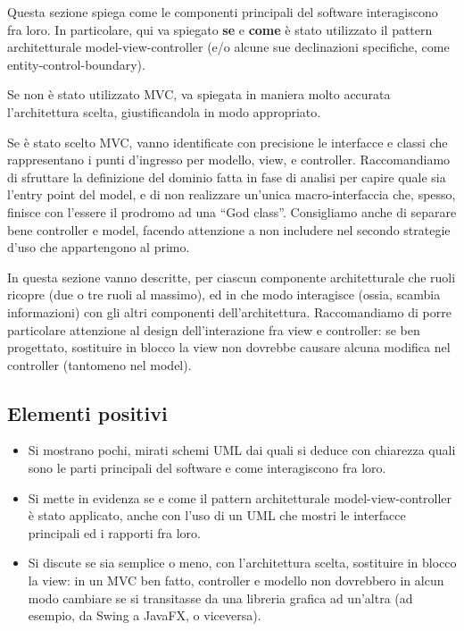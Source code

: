 \documentclass[a4paper,12pt]{report}
\begin{document}
Questa sezione spiega come le componenti principali del software interagiscono fra loro.
%
In particolare, qui va spiegato \textbf{se} e \textbf{come} è stato utilizzato il pattern
architetturale model-view-controller (e/o alcune sue declinazioni specifiche, come entity-control-boundary).

Se non è stato utilizzato MVC, va spiegata in maniera molto accurata l'architettura scelta, giustificandola in modo appropriato.

Se è stato scelto MVC, vanno identificate con precisione le interfacce e classi che rappresentano i punti d'ingresso per modello, view, e controller.
Raccomandiamo di sfruttare la definizione del dominio fatta in fase di analisi per capire quale sia l'entry point del model, e di non realizzare un'unica macro-interfaccia che, spesso, finisce con l'essere il prodromo ad una ``God class''.
%
Consigliamo anche di separare bene controller e model, facendo attenzione a non includere nel secondo strategie d'uso che appartengono al primo.

In questa sezione vanno descritte, per ciascun componente architetturale che ruoli ricopre (due o tre ruoli al massimo), ed in che modo interagisce (ossia, scambia informazioni) con gli altri componenti dell'architettura.
%
Raccomandiamo di porre particolare attenzione al design dell'interazione fra view e controller: se ben progettato, sostituire in blocco la view non dovrebbe causare alcuna modifica nel controller (tantomeno nel model).

\subsection*{Elementi positivi}
\begin{itemize}
 \item Si mostrano pochi, mirati schemi UML dai quali si deduce con chiarezza quali sono le parti principali del software e come interagiscono fra loro.
 \item Si mette in evidenza se e come il pattern architetturale model-view-controller è stato applicato, anche con l'uso di un UML che mostri le interfacce principali ed i rapporti fra loro.
 \item Si discute se sia semplice o meno, con l'architettura scelta, sostituire in blocco la view: in un MVC ben fatto, controller e modello non dovrebbero in alcun modo cambiare se si transitasse da una libreria grafica ad un'altra (ad esempio, da Swing a JavaFX, o viceversa).
\end{itemize}
\end{document}
